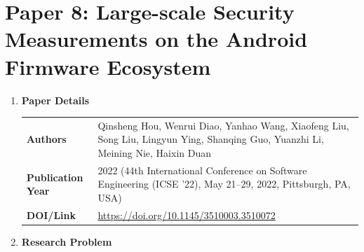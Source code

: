 \documentclass[11pt,a4paper]{article}
\newcommand{\entrypart}[1]{\textbf{\color{accent}#1}\par\vspace{2pt}}
\begin{document}
\newpage

\section{Paper 8: Large-scale Security Measurements on the Android Firmware Ecosystem}

\begin{enumerate}

    \item \entrypart{Paper Details}

    \begin{tabular}{@{}>{\bfseries}p{3.2cm} p{11.5cm}@{}}
        Authors          & Qinsheng Hou, Wenrui Diao, Yanhao Wang, Xiaofeng Liu, Song Liu, Lingyun Ying, Shanqing Guo, Yuanzhi Li, Meining Nie, Haixin Duan \\[2pt]
        Publication Year & 2022 (44th International Conference on Software Engineering (ICSE '22), May 21--29, 2022, Pittsburgh, PA, USA) \\[2pt]
        DOI/Link         & \url{https://doi.org/10.1145/3510003.3510072}
    \end{tabular}

    \item \entrypart{Research Problem}


\end{enumerate}
\end{document}
